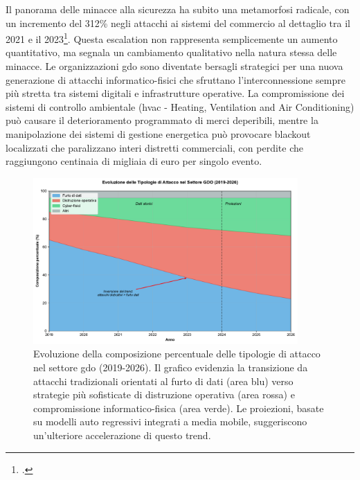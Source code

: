 Il panorama delle minacce alla sicurezza ha subito una metamorfosi radicale, con un incremento del 312\% negli attacchi ai sistemi del commercio al dettaglio tra il 2021 e il 2023\footcite{enisa2024retail}. Questa escalation non rappresenta semplicemente un aumento quantitativo, ma segnala un cambiamento qualitativo nella natura stessa delle minacce. Le organizzazioni \gls{gdo} sono diventate bersagli strategici per una nuova generazione di attacchi informatico-fisici che sfruttano l'interconnessione sempre più stretta tra sistemi digitali e infrastrutture operative. La compromissione dei sistemi di controllo ambientale (\gls{hvac} - Heating, Ventilation and Air Conditioning) può causare il deterioramento programmato di merci deperibili, mentre la manipolazione dei sistemi di gestione energetica può provocare blackout localizzati che paralizzano interi distretti commerciali, con perdite che raggiungono centinaia di migliaia di euro per singolo evento.

\begin{figure}[htbp]
\centering
\includegraphics[width=0.9\textwidth]{thesis_figures/cap1/fig_evoluzione_attacchi.pdf}
\caption[Evoluzione della composizione percentuale delle tipologie di attacco nel settore GDO (2019-2026)]{Evoluzione della composizione percentuale delle tipologie di attacco nel settore \gls{gdo} (2019-2026). Il grafico evidenzia la transizione da attacchi tradizionali orientati al furto di dati (area blu) verso strategie più sofisticate di distruzione operativa (area rossa) e compromissione informatico-fisica (area verde). Le proiezioni, basate su modelli auto regressivi integrati a media mobile, suggeriscono un'ulteriore accelerazione di questo trend.}
\label{fig:evoluzione_attacchi}
\end{figure}

